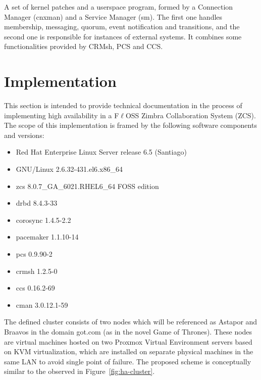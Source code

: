 \documentclass[a4paper, 12pt]{book}
\begin{document}
\noindent A set of kernel patches and a userspace program, formed by a Connection Manager (cnxman) and a Service Manager (sm). The first one handles membership, messaging, quorum, event notification and transitions, and the second one is responsible for instances of external systems. It combines some functionalities provided by CRMsh, PCS and CCS.


%
\chapter{Implementation}
\label{chap:implementation}

This section is intended to provide technical documentation in the process of implementing high availability in a F$\ell$OSS Zimbra Collaboration System (ZCS). The scope of this implementation is framed by the following software components and versions:

\begin{itemize}
	\setlength{\itemsep}{0pt}
	\item Red Hat Enterprise Linux Server release 6.5 (Santiago)
	\item GNU/Linux 2.6.32-431.el6.x86\_64
	\item zcs 8.0.7\_GA\_6021.RHEL6\_64 FOSS edition
	\item drbd 8.4.3-33
	\item corosync 1.4.5-2.2
	\item pacemaker 1.1.10-14
	\item pcs 0.9.90-2
	\item crmsh 1.2.5-0
	\item ccs 0.16.2-69
	\item cman 3.0.12.1-59
\end{itemize}

\noindent The defined cluster consists of two nodes which will be referenced as Astapor and Braavos in the domain got.com (as in the novel Game of Thrones). These nodes are virtual machines hosted on two Proxmox Virtual Environment servers based on KVM virtualization, which are installed on separate physical machines in the same LAN to avoid single point of failure. The proposed scheme is conceptually similar to the observed in Figure~\ref{fig:ha-cluster}.
\end{document}
